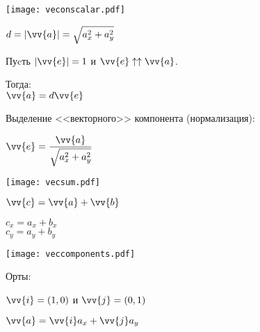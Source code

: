 \documentclass[10pt]{beamer}
\begin{document}
    
    {
    	{
    		
			\texttt{[image: veconscalar.pdf]}
    		
    		
    	}
    	{
    		$d = |\vv{a}| = \sqrt{a_x^2 + a_y^2}$
    		
    		\hfill 
    		
    		Пуcть $|\vv{e}| = 1$ и $\vv{e} \uparrow \uparrow \vv{a} $.
    		
    		Тогда: \\
    		$\vv{a} = d\vv{e}$ 
    		
    		\hfill
    		
    		{\scriptsize Выделение <<векторного>> компонента (нормализация):}
    		
    		$\vv{e} = \displaystyle\frac{\vv{a}}{\sqrt{a_x^2 + a_y^2}}$
    		
    	
    	}
    	
    }
    
    
    
    
    
    {
    	{
    		
    		\texttt{[image: vecsum.pdf]}    		
    		
    	}
    	{
    		$\vv{c} = \vv{a} + \vv{b}$
    		
    		\hfill
    		
    		$c_x = a_x + b_x$\\
    		$c_y = a_y + b_y$
    		
    	}
    	
    }
    
    
    {
    	{
    		
    		\texttt{[image: veccomponents.pdf]}
    		
    		
    	}
    	{
    		Орты:
    		
    		$\vv{i} = (1,0)$ и 	$\vv{j} = (0,1)$
    		
    		\hfill
    		
    		$\vv{a} = \vv{i}a_x+\vv{j}a_y$
    		
    	}
    	
    }
    
\end{document}
